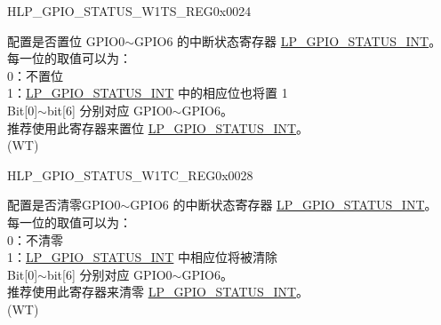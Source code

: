\begin{register}{H}{LP\_GPIO\_STATUS\_W1TS\_REG}{0x0024}\label{regdesc:LPGPIOSTATUSW1TSREG}
%
%
\regnewline%
\begin{regdesc}\begin{reglist}
\label{fielddesc:LPGPIOSTATUSW1TS}\item [LP\_GPIO\_STATUS\_W1TS] 配置是否置位 GPIO0$\sim$GPIO6 的中断状态寄存器 \hyperref[regdesc:LPGPIOSTATUSREG]{LP\_GPIO\_STATUS\_INT}。\\
每一位的取值可以为：\\
0：不置位\\
1：\hyperref[regdesc:LPGPIOSTATUSREG]{LP\_GPIO\_STATUS\_INT} 中的相应位也将置 1\\
Bit[0]$\sim$bit[6] 分别对应 GPIO0$\sim$GPIO6。\\
推荐使用此寄存器来置位 \hyperref[regdesc:LPGPIOSTATUSREG]{LP\_GPIO\_STATUS\_INT}。 \\
(WT)
\end{reglist}\end{regdesc}
\end{register}


\begin{register}{H}{LP\_GPIO\_STATUS\_W1TC\_REG}{0x0028}\label{regdesc:LPGPIOSTATUSW1TCREG}
%
%
\regnewline%
\begin{regdesc}\begin{reglist}
\label{fielddesc:LPGPIOSTATUSW1TC}\item [LP\_GPIO\_STATUS\_W1TC] 配置是否清零GPIO0$\sim$GPIO6 的中断状态寄存器 \hyperref[regdesc:LPGPIOSTATUSREG]{LP\_GPIO\_STATUS\_INT}。 \\
每一位的取值可以为：\\
0：不清零\\
1：\hyperref[regdesc:LPGPIOSTATUSREG]{LP\_GPIO\_STATUS\_INT} 中相应位将被清除\\
Bit[0]$\sim$bit[6] 分别对应 GPIO0$\sim$GPIO6。\\
推荐使用此寄存器来清零 \hyperref[regdesc:LPGPIOSTATUSREG]{LP\_GPIO\_STATUS\_INT}。\\
(WT)
\end{reglist}\end{regdesc}
\end{register}


